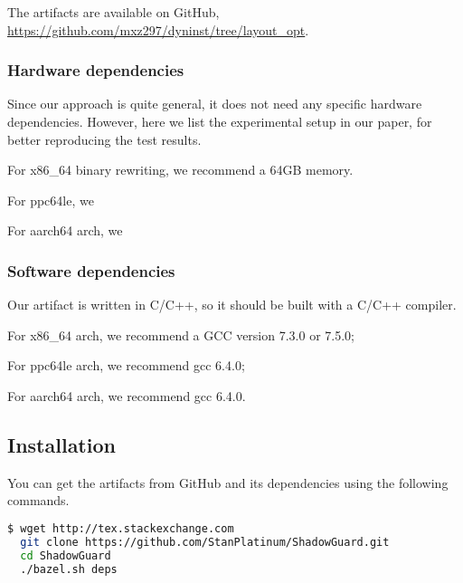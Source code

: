 \documentclass{sigplanconf}
\begin{document}
{The artifacts are available on GitHub, \url{https://github.com/mxz297/dyninst/tree/layout_opt}.


\subsubsection{Hardware dependencies}

Since our approach is quite general, it does not need any specific hardware dependencies. 
However, here we list the experimental setup in our paper, for better reproducing the test results.

For x86\_64 binary rewriting, we recommend a 64GB memory.

For ppc64le, we

For aarch64 arch, we

\subsubsection{Software dependencies}

Our artifact is written in C/C++, so it should be built with a C/C++ compiler.

For x86\_64 arch, we recommend a GCC version 7.3.0 or 7.5.0;

For ppc64le arch, we recommend gcc 6.4.0; 

For aarch64 arch, we recommend gcc 6.4.0.




\subsection{Installation}


You can get the artifacts from GitHub and its dependencies using the following
commands.


\begin{lstlisting}[language=bash]
  $ wget http://tex.stackexchange.com
  git clone https://github.com/StanPlatinum/ShadowGuard.git
  cd ShadowGuard
  ./bazel.sh deps
\end{lstlisting}




}
\end{document}
